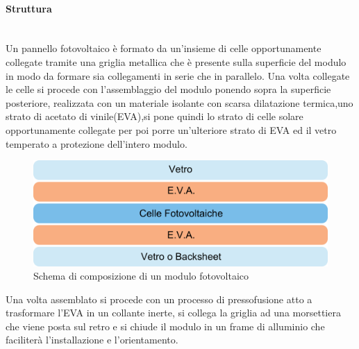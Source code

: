 \paragraph{Struttura}\mbox{}\\
Un pannello fotovoltaico è formato da un'insieme di celle opportunamente collegate tramite una griglia metallica che è presente sulla superficie del modulo in modo da formare sia collegamenti in serie che in parallelo. Una volta collegate le celle si procede con l'assemblaggio del modulo ponendo sopra la superficie posteriore, realizzata con un materiale isolante con scarsa dilatazione termica,uno strato di acetato di vinile(EVA),si pone quindi lo strato di celle solare opportunamente collegate per poi porre un'ulteriore strato di EVA ed il vetro temperato a protezione dell'intero modulo.\\
\begin{figure}[H]
    \centering
    \includegraphics[height=0.3\textwidth]{res/cap 3/composizione modulo.png}
    \caption{Schema di composizione di un modulo fotovoltaico}
\end{figure}\noindent
Una volta assemblato si procede con un processo di pressofusione atto a trasformare l'EVA in un collante inerte, si collega la griglia ad una morsettiera che viene posta sul retro e si chiude il modulo in un frame di alluminio che faciliterà l'installazione e l'orientamento.
